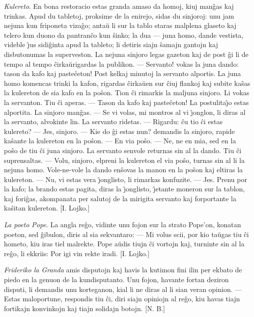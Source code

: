 \emph{Kulereto}. En bona restoracio estas granda amaso da homoj,
kiuj man\^gas kaj trinkas. Apud du tabletoj, proksime de la enirejo,
sidas du sinjoroj: unu jam nejuna kun friponeta viza\^go; anta\u u
li sur la tablo staras malplena glaseto kaj telero kun duono da
pantran\^co kun \^sinko; la dua --- juna homo, dande vestista,
videble \^{\j}us sidi\^ginta apud la tableto; li detiris siajn
\^samajn gantojn kaj disbutonumas la superveston. La nejuna sinjoro
legas gazeton kaj de post \^gi li de tempo al tempo \^cirka\u
urigardas la publikon. --- Servanto! vokas la juna dando: tason da
kafo kaj paste\^ceton! Post kelkaj minutoj la servanto alportis. La
juna homo komencas trinki la kafon, rigardas \^cirka\u uen sur
\^ciuj flankoj kaj subite ka\^sas la kulereton de sia kafo en la
po\^son. Tion \^ci rimarkis la maljuna sinjoro. Li vokas la
servanton. Tiu \^ci aperas. --- Tason da kafo kaj paste\^ceton! La
postulita\^{\j}o estas alportita. La sinjoro man\^gas. --- Se vi
volas, mi montros al vi \^{\j}onglon, li diras al la servanto,
alvokinte lin. La servanto ridetas. --- Rigardu: \^cu tio \^ci estas
kulereto? --- Jes, sinjoro. --- Kie do \^gi estas nun? demandis la
sinjoro, rapide ka\^sante la kulereton en la po\^son.
--- En via po\^so. --- Ne, ne en mia, sed en la po\^so de tiu \^ci
juna sinjoro. La servanto senvole returnas sin al la dando. Tiu \^ci
suprensaltas. --- Volu, sinjoro, elpreni la kulereton el via po\^so,
turnas sin al li la nejuna homo. Vole-ne-vole la dando en\^sovas la
manon en la po\^son kaj eltiras la kulereton. --- Nu, vi estas vera
\^{\j}onglisto, li rimarkas konfuzite. --- Jes. Prenu por la kafo;
la brando estas pagita, diras la \^{\j}onglisto, \^{\j}etante
moneron sur la tablon, kaj fori\^gas, akompanata per salutoj de la
mirigita servanto kaj forportante la ka\^sitan kulereton. [I.
Lojko.]

\emph{La poeto Pope}. La angla re\^go, vidinte unu fojon sur la
strato Pope'on, konatan poeton, sed \^gibulon, diris al sia
sekvantaro: --- Mi volus scii, por kio ta\u ugas tiu \^ci hometo,
kiu iras tiel malrekte. Pope a\u udis tiujn \^ci vortojn kaj,
turninte sin al la re\^go, li ekkriis: Por igi vin rekte iradi. [I.
Lojko.]

\emph{Frideriko la Granda} amis disputojn kaj havis la kutimon fini
ilin per ekbato de piedo en la genuon de la kundisputanto. Unu
fojon, havante fortan deziron disputi, li demandis unu korteganon,
kial li ne diras al li sian veran opinion. --- Estas maloportune,
respondis tiu \^ci, diri siajn opiniojn al re\^go, kiu havas tiajn
fortikajn konvinkojn kaj tiajn solidajn botojn. [N. B.]

